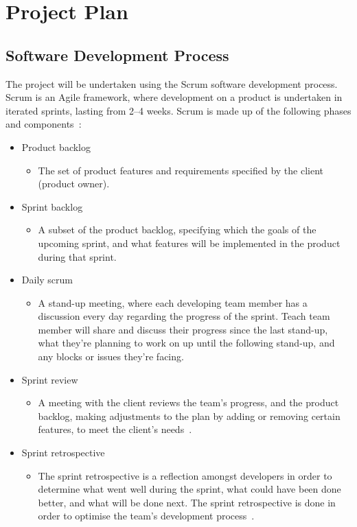 \documentclass[12pt,openany,a4paper]{book}
\begin{document}
\section{Project Plan}
\label{secn:project_plan}

\subsection{Software Development Process}
\label{secn:software_development_process}

The project will be undertaken using the Scrum software development process.
Scrum is an Agile framework, where development on a product is undertaken in
iterated sprints, lasting from 2--4 weeks. Scrum is made up of the following
phases and components~\cite{scrum_intro}:
\begin{itemize}
	\item Product backlog
	\begin{itemize}
		\item The set of product features and requirements specified by the
		client (product owner).
	\end{itemize}
	\item Sprint backlog
	\begin{itemize}
		\item A subset of the product backlog, specifying which the goals of the
		upcoming sprint, and what features will be implemented in the product
		during that sprint.
	\end{itemize}
	\item Daily scrum
	\begin{itemize}
		\item A stand-up meeting, where each developing team member has a
		discussion every day regarding the progress of the sprint. Teach team
		member will share and discuss their progress since the last stand-up,
		what they're planning to work on up until the following stand-up, and
		any blocks or issues they're facing.
	\end{itemize}
	\item Sprint review
	\begin{itemize}
		\item A meeting with the client reviews the team's progress, and the
		product backlog, making adjustments to the plan by adding or removing
		certain features, to meet the client's needs~\cite{scrum_sprint_review}.
	\end{itemize}
	\item Sprint retrospective
	\begin{itemize}
		\item The sprint retrospective is a reflection amongst developers in
		order to determine what went well during the sprint, what could have
		been done better, and what will be done next. The sprint retrospective
		is done in order to optimise the team's development process~\cite{scrum_sprint_retrospective}.
	\end{itemize}
\end{itemize}
\end{document}
